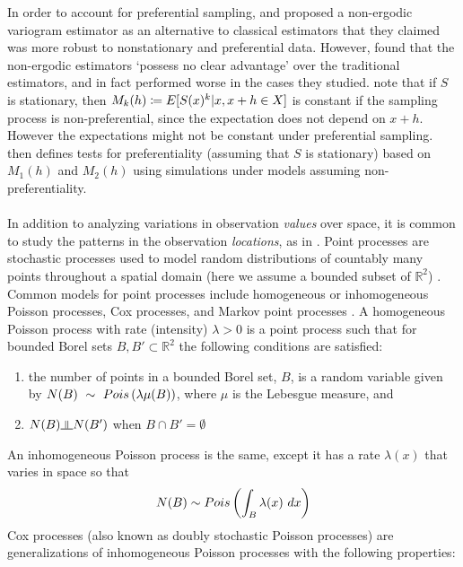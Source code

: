 \documentclass{uwstat572}
\begin{document}
\par
{}
In order to account for preferential sampling, \citet{isaaks1988} and \citet{srivastava1989} proposed a non-ergodic variogram estimator as an alternative to classical estimators that they claimed was more robust to nonstationary and preferential data.  However, \citet{curriero2002} found that the non-ergodic estimators `possess no clear advantage' over the traditional estimators, and in fact performed worse in the cases they studied.  \citet{schlather2004} note that if $S$ is stationary, then $M_k(h) \coloneqq E[S(x)^k \vert x, x+h \in X]$ is constant if the sampling process is non-preferential, since the expectation does not depend on $x+h$.  However the expectations might not be constant under preferential sampling.  \citet{schlather2004} then defines tests for preferentiality (assuming that $S$ is stationary) based on $M_1(h)$ and $M_2(h)$ using simulations under models assuming non-preferentiality.
\\\\
In addition to analyzing variations in observation \emph{values} over space, it is common to study the patterns in the observation \emph{locations}, as in \citet{diggle2010}.  Point processes are stochastic processes used to model random distributions of countably many points throughout a spatial domain (here we assume a bounded subset of $\mathbb{R}^2$) \citep{handbook}.  Common models for point processes include homogeneous or inhomogeneous Poisson processes, Cox processes, and Markov point processes \citep{handbook}.  A homogeneous Poisson process with rate (intensity) $\lambda > 0$ is a point process such that for bounded Borel sets $B, B' \subset \mathbb{R}^2$ the following conditions are satisfied:
\begin{enumerate}
\item the number of points in a bounded Borel set, $B$, is a random variable given by $N(B)~\sim~Pois \left( \lambda \mu(B) \right) $, where $\mu$ is the Lebesgue measure, and
\item $N(B) \indep N(B')$ when $B \cap B' = \emptyset$
\end{enumerate}
An inhomogeneous Poisson process is the same, except it has a rate $\lambda(x)$ that varies in space so that 
$$ N(B) \sim Pois \left( \int_B \lambda(x) \ dx \right) $$
Cox processes \citep{cox1955} (also known as doubly stochastic Poisson processes) are generalizations of inhomogeneous Poisson processes with the following properties:
\end{document}
